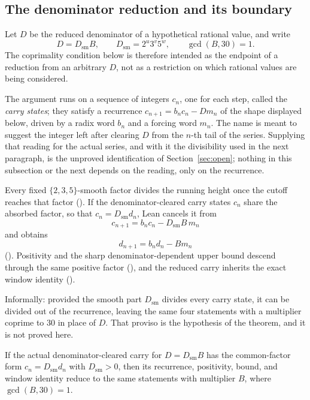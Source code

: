 \documentclass[11pt]{article}
\begin{document}
\subsection{The denominator reduction and its boundary}

Let $D$ be the reduced denominator of a hypothetical rational value, and write
\[
  D=D_{\mathrm{sm}}B,\qquad
  D_{\mathrm{sm}}=2^{u}3^{v}5^{w},\qquad \gcd(B,30)=1.
\]
The coprimality condition below is therefore intended as the endpoint of a
reduction from an arbitrary $D$, not as a restriction on which rational values
are being considered.

The argument runs on a sequence of integers $c_n$, one for each step, called
the \emph{carry states}; they satisfy a recurrence
$c_{n+1}=b_nc_n-Dm_n$ of the shape displayed below, driven by a radix word
$b_n$ and a forcing word $m_n$.  The name is meant to suggest the integer left
after clearing $D$ from the $n$-th tail of the series.  Supplying that reading
for the actual series, and with it the divisibility used in the next paragraph,
is the unproved identification of Section~\ref{sec:open}; nothing in this
subsection or the next depends on the reading, only on the recurrence.

Every fixed $\{2,3,5\}$-smooth factor divides the
running height once the cutoff reaches that factor
().  If the denominator-cleared carry states $c_n$ share the absorbed
factor, so that $c_n=D_{\mathrm{sm}}d_n$, Lean cancels it from
\[
  c_{n+1}=b_nc_n-D_{\mathrm{sm}}B\,m_n
\]
and obtains
\[
  d_{n+1}=b_nd_n-Bm_n
\]
().  Positivity and the sharp denominator-dependent upper bound
descend through the same positive factor
(), and the reduced carry inherits the exact window identity
().

Informally: provided the smooth part $D_{\mathrm{sm}}$ divides every carry
state, it can be divided out of the recurrence, leaving the same four
statements with a multiplier coprime to $30$ in place of $D$.  That proviso is
the hypothesis of the theorem, and it is not proved here.

\begin{theorem}\label{res:denominator-reduction}
If the actual denominator-cleared carry for $D=D_{\mathrm{sm}}B$ has the
common-factor form $c_n=D_{\mathrm{sm}}d_n$ with $D_{\mathrm{sm}}>0$, then its
recurrence, positivity, bound, and window identity reduce to the same statements
with multiplier $B$, where $\gcd(B,30)=1$.
\end{theorem}
\end{document}
